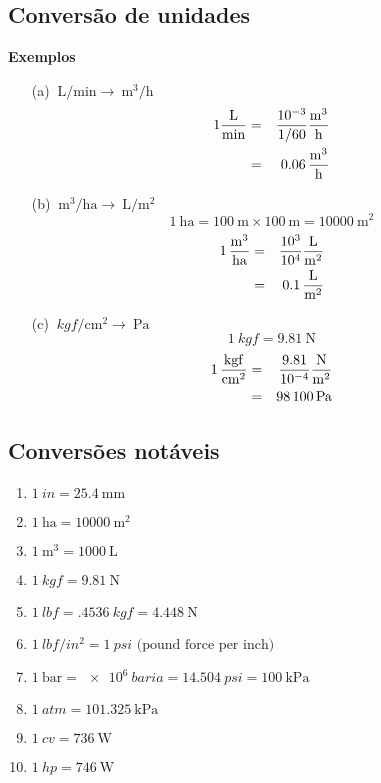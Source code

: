 \documentclass[
	a4paper, 
	12pt, 
	brazilian
]{article}
\begin{document}
	\subsection{Conversão de unidades}
	\textbf{Exemplos}
	\begin{enumerate}
		\item[(a)]$\SI{}{\liter/\minute}\rightarrow\SI{}{\meter^{3}/\hour}$
		\begin{eqnarray}
			1\SI{}{\dfrac{\liter}{\minute}}&=&\dfrac{10^{-3}}{1/60}\SI{}{\dfrac{\meter^{3}}{\hour}}\\
			&=&\SI{.06}{\dfrac{\meter^{3}}{\hour}}	
		\end{eqnarray}
		\item[(b)]$\SI{}{\meter^{3}/\hectare}\rightarrow\SI{}{\liter/\meter^{2}}$
		\begin{equation}
			\SI{1}{\hectare}=\SI{100}{\meter}\times\SI{100}{\meter}=\SI{10000}{\meter^{2}}
		\end{equation}
		\begin{eqnarray}
			\SI{1}{\dfrac{\meter^{3}}{\hectare}}&=&\dfrac{10^{3}}{10^{4}}\SI{}{\dfrac{\liter}{\meter^{2}}}\\
			&=&\SI{.1}{\dfrac{\liter}{\meter^{2}}}
		\end{eqnarray}
		\item[(c)]$\SI{}{kgf/\centi\meter^{2}}\rightarrow\SI{}{\pascal}$
		\begin{equation}
			\SI{1}{kgf}=\SI{9.81}{\newton}
		\end{equation}
		\begin{eqnarray}
			\SI{1}{\dfrac{kgf}{\centi\meter^{2}}}&=&\dfrac{9.81}{10^{-4}}\SI{}{\dfrac{\newton}{\meter^{2}}}\\
			&=&\SI{98100}{\pascal}
		\end{eqnarray}
	\end{enumerate}
	\subsection{Conversões notáveis}
	\begin{enumerate}
		\item$\SI{1}{in}=\SI{25.4}{\milli\meter}$
		\item$\SI{1}{\hectare}=\SI{10000}{\meter^{2}}$
		\item$\SI{1}{\meter^{3}}=\SI{1000}{\liter}$
		\item$\SI{1}{kgf}=\SI{9.81}{\newton}$
		\item$\SI{1}{lbf}=\SI{.4536}{kgf}=\SI{4.448}{\newton}$
		\item$\SI{1}{lbf/in^{2}}=\SI{1}{psi}\,\,\textrm{(pound force per inch)}$
		\item$\SI{1}{\bar}=\SI{e6}{baria}=\SI{14.504}{psi}=\SI{100}{\kilo\pascal}$
		\item$\SI{1}{atm}=\SI{101.325}{\kilo\pascal}$
		\item$\SI{1}{cv}=\SI{736}{\watt}$
		\item$\SI{1}{hp}=\SI{746}{\watt}$
	\end{enumerate}

	
\end{document}
